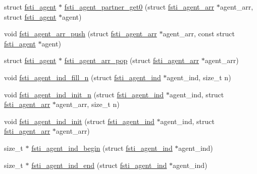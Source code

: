 \begin{DoxyCompactItemize}
\item 
struct \mbox{\hyperlink{structfsti__agent}{fsti\+\_\+agent}} $\ast$ \mbox{\hyperlink{fsti-agent_8c_abe4c0c13ceb1a50eb8d9223a7122f269}{fsti\+\_\+agent\+\_\+partner\+\_\+get0}} (struct \mbox{\hyperlink{structfsti__agent__arr}{fsti\+\_\+agent\+\_\+arr}} $\ast$agent\+\_\+arr, struct \mbox{\hyperlink{structfsti__agent}{fsti\+\_\+agent}} $\ast$agent)
\item 
void \mbox{\hyperlink{fsti-agent_8c_a0cf9bb69026e48287e83f9d73841f90f}{fsti\+\_\+agent\+\_\+arr\+\_\+push}} (struct \mbox{\hyperlink{structfsti__agent__arr}{fsti\+\_\+agent\+\_\+arr}} $\ast$agent\+\_\+arr, const struct \mbox{\hyperlink{structfsti__agent}{fsti\+\_\+agent}} $\ast$agent)
\item 
struct \mbox{\hyperlink{structfsti__agent}{fsti\+\_\+agent}} $\ast$ \mbox{\hyperlink{fsti-agent_8c_a140245276760c5ca1467b816dfdb16d9}{fsti\+\_\+agent\+\_\+arr\+\_\+pop}} (struct \mbox{\hyperlink{structfsti__agent__arr}{fsti\+\_\+agent\+\_\+arr}} $\ast$agent\+\_\+arr)
\item 
void \mbox{\hyperlink{fsti-agent_8c_ad710a67a71582f5e8a63490c1afe3a3c}{fsti\+\_\+agent\+\_\+ind\+\_\+fill\+\_\+n}} (struct \mbox{\hyperlink{structfsti__agent__ind}{fsti\+\_\+agent\+\_\+ind}} $\ast$agent\+\_\+ind, size\+\_\+t n)
\item 
void \mbox{\hyperlink{fsti-agent_8c_a863d835b0643a8d62d8621bd512fd902}{fsti\+\_\+agent\+\_\+ind\+\_\+init\+\_\+n}} (struct \mbox{\hyperlink{structfsti__agent__ind}{fsti\+\_\+agent\+\_\+ind}} $\ast$agent\+\_\+ind, struct \mbox{\hyperlink{structfsti__agent__arr}{fsti\+\_\+agent\+\_\+arr}} $\ast$agent\+\_\+arr, size\+\_\+t n)
\item 
void \mbox{\hyperlink{fsti-agent_8c_a15fb161e3b2c757f6dc7d67af4e6ef3d}{fsti\+\_\+agent\+\_\+ind\+\_\+init}} (struct \mbox{\hyperlink{structfsti__agent__ind}{fsti\+\_\+agent\+\_\+ind}} $\ast$agent\+\_\+ind, struct \mbox{\hyperlink{structfsti__agent__arr}{fsti\+\_\+agent\+\_\+arr}} $\ast$agent\+\_\+arr)
\item 
size\+\_\+t $\ast$ \mbox{\hyperlink{fsti-agent_8c_af8ec082c043d0719f2933f78c9b74879}{fsti\+\_\+agent\+\_\+ind\+\_\+begin}} (struct \mbox{\hyperlink{structfsti__agent__ind}{fsti\+\_\+agent\+\_\+ind}} $\ast$agent\+\_\+ind)
\item 
size\+\_\+t $\ast$ \mbox{\hyperlink{fsti-agent_8c_a0a007fca1a85b26dc9f890b5c9f5649a}{fsti\+\_\+agent\+\_\+ind\+\_\+end}} (struct \mbox{\hyperlink{structfsti__agent__ind}{fsti\+\_\+agent\+\_\+ind}} $\ast$agent\+\_\+ind)
\item 

\end{DoxyCompactItemize}
